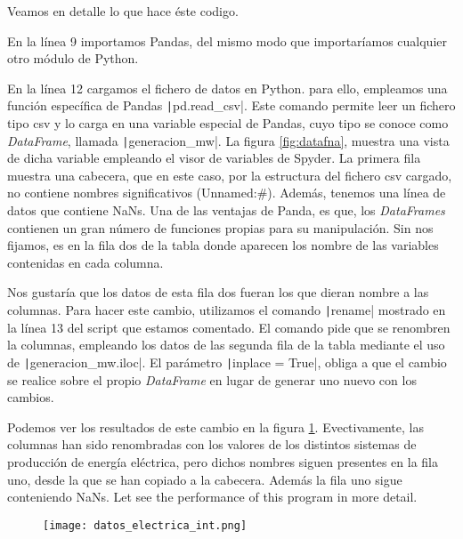 \begin{paracol}{2}
 	
Veamos en detalle lo que hace éste codigo.

En la línea 9 importamos Pandas, del mismo modo que importaríamos cualquier otro módulo de Python. 

En la línea 12 cargamos el fichero de datos en Python. para ello, empleamos una función específica de Pandas \texttt|pd.read_csv|. Este comando permite leer un fichero tipo csv y lo carga en una variable especial de Pandas, cuyo tipo se conoce como \emph{DataFrame}, llamada \texttt|generacion_mw|. La figura \ref{fig:datafna}, muestra una vista de dicha variable empleando el visor de variables de Spyder. La primera fila muestra una cabecera, que en este caso, por la estructura del fichero csv cargado, no contiene nombres significativos (Unnamed:\#). Además, tenemos una línea de datos que contiene NaNs. Una de las ventajas de Panda, es que, los \emph{DataFrames} contienen un gran número de funciones propias para su manipulación. Sin nos fijamos, es en la fila dos de la tabla donde aparecen los nombre de las variables contenidas en cada columna.

Nos gustaría que los datos de esta fila dos fueran los que dieran nombre a las columnas. Para hacer este cambio, utilizamos el comando \texttt|rename| mostrado en la línea 13 del script que estamos comentado. El comando pide que se renombren la columnas, empleando los datos de las segunda fila de la tabla mediante el uso de \texttt|generacion_mw.iloc|. El parámetro \texttt|inplace = True|, obliga a que el cambio se realice sobre el propio \emph{DataFrame} en lugar de generar uno nuevo con los cambios.

Podemos ver los resultados de este cambio en la figura \ref{fig:datafint}. Evectivamente, las columnas han sido renombradas con los valores de los distintos sistemas de producción de energía eléctrica, pero dichos nombres siguen presentes en la fila uno, desde la que se han copiado a la cabecera. Además la fila uno sigue conteniendo NaNs.
\switchcolumn
Let see the performance of this program in more detail.                 
\end{paracol}
\begin{figure}
	\centering
	\texttt{[image: datos\_electrica\_int.png]}
	\label{fig:datafint}
\end{figure}

